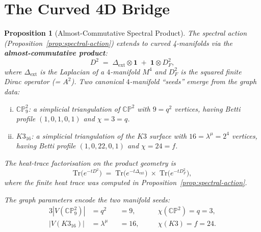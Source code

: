 \documentclass[12pt,a4paper]{article}
\newtheorem{proposition}[theorem]{Proposition}
\begin{document}
\section{The Curved 4D Bridge}
\label{sec:curved-bridge}

\begin{proposition}[Almost-Commutative Spectral Product]\label{prop:curved-bridge}
The spectral action (Proposition~\ref{prop:spectral-action}) extends to
curved 4-manifolds via the \textbf{almost-commutative product}:
\[
  D^2 \;=\; \Delta_{\mathrm{ext}} \otimes \mathbf{1}
  \;+\; \mathbf{1} \otimes D_F^2,
\]
where $\Delta_{\mathrm{ext}}$ is the Laplacian of a $4$-manifold $M^4$
and $D_F^2$ is the squared finite Dirac operator (= $A^2$).
Two canonical $4$-manifold ``seeds'' emerge from the graph data:
\begin{enumerate}[(i)]
  \item \textbf{$\mathbb{CP}^2_9$}: a simplicial triangulation of
        $\mathbb{CP}^2$ with $9 = q^2$ vertices, having
        Betti profile $(1,0,1,0,1)$ and $\chi = 3 = q$.
  \item \textbf{$K3_{16}$}: a simplicial triangulation of the
        $K3$ surface with $16 = \lambda^\mu = 2^4$ vertices,
        having Betti profile $(1,0,22,0,1)$ and $\chi = 24 = f$.
\end{enumerate}
The heat-trace factorisation on the product geometry is
\[
  \mathrm{Tr}\bigl(e^{-t D^2}\bigr)
  \;=\; \mathrm{Tr}\bigl(e^{-t\Delta_{\mathrm{ext}}}\bigr)
  \;\times\; \mathrm{Tr}\bigl(e^{-t D_F^2}\bigr),
\]
where the finite heat trace was computed in
Proposition~\ref{prop:spectral-action}.

The graph parameters encode the two manifold seeds:
\begin{alignat*}{3}
  |V(\mathbb{CP}^2_9)| &= q^2 &&= 9, &\quad&
    \chi(\mathbb{CP}^2) = q = 3, \\
  |V(K3_{16})| &= \lambda^\mu &&= 16, &&
    \chi(K3) = f = 24.
\end{alignat*}
\end{proposition}
\end{document}
